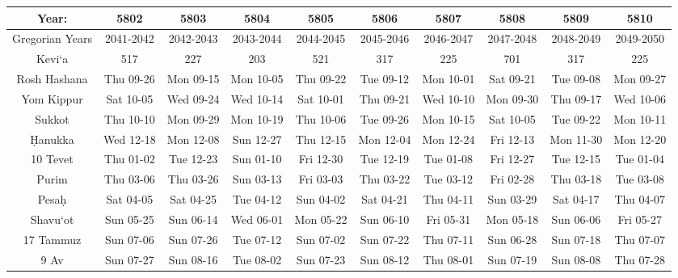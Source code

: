 \begin{footnotesize}
\begin{tabular}{c | c | c | c | c | c | c | c | c | c}
	Year:&5802&5803&5804&5805&5806&5807&5808&5809&5810\\\hline
	Gregorian Years&2041-2042&2042-2043&2043-2044&2044-2045&2045-2046&2046-2047&2047-2048&2048-2049&2049-2050\\\hline
	Kevi`a&517&227&203&521&317&225&701&317&225\\\hline
	Rosh Hashana&Thu 09-26&Mon 09-15&Mon 10-05&Thu 09-22&Tue 09-12&Mon 10-01&Sat 09-21&Tue 09-08&Mon 09-27\\\hline
	Yom Kippur&Sat 10-05&Wed 09-24&Wed 10-14&Sat 10-01&Thu 09-21&Wed 10-10&Mon 09-30&Thu 09-17&Wed 10-06\\\hline
	Sukkot&Thu 10-10&Mon 09-29&Mon 10-19&Thu 10-06&Tue 09-26&Mon 10-15&Sat 10-05&Tue 09-22&Mon 10-11\\\hline
	\d{H}anukka&Wed 12-18&Mon 12-08&Sun 12-27&Thu 12-15&Mon 12-04&Mon 12-24&Fri 12-13&Mon 11-30&Mon 12-20\\\hline
	10 Tevet&Thu 01-02&Tue 12-23&Sun 01-10&Fri 12-30&Tue 12-19&Tue 01-08&Fri 12-27&Tue 12-15&Tue 01-04\\\hline
	Purim&Thu 03-06&Thu 03-26&Sun 03-13&Fri 03-03&Thu 03-22&Tue 03-12&Fri 02-28&Thu 03-18&Tue 03-08\\\hline
	Pesa\d{h}&Sat 04-05&Sat 04-25&Tue 04-12&Sun 04-02&Sat 04-21&Thu 04-11&Sun 03-29&Sat 04-17&Thu 04-07\\\hline
	Shavu`ot&Sun 05-25&Sun 06-14&Wed 06-01&Mon 05-22&Sun 06-10&Fri 05-31&Mon 05-18&Sun 06-06&Fri 05-27\\\hline
	17 Tammuz&Sun 07-06&Sun 07-26&Tue 07-12&Sun 07-02&Sun 07-22&Thu 07-11&Sun 06-28&Sun 07-18&Thu 07-07\\\hline
	9 Av&Sun 07-27&Sun 08-16&Tue 08-02&Sun 07-23&Sun 08-12&Thu 08-01&Sun 07-19&Sun 08-08&Thu 07-28\\\hline
\end{tabular}
\end{footnotesize}
